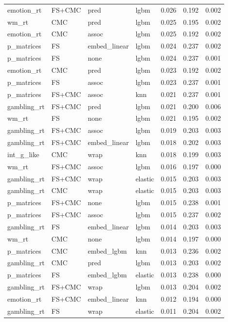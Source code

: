 \documentclass{article}
\begin{document}
\begin{longtable}{llllrrr}
	emotion\_rt & FS+CMC & pred & lgbm & 0.026 & 0.192 & 0.002 \\
	wm\_rt & CMC & pred & lgbm & 0.025 & 0.195 & 0.002 \\
	emotion\_rt & CMC & assoc & lgbm & 0.025 & 0.192 & 0.002 \\
	p\_matrices & FS & embed\_linear & lgbm & 0.024 & 0.237 & 0.002 \\
	p\_matrices & FS & none & lgbm & 0.024 & 0.237 & 0.001 \\
	emotion\_rt & CMC & pred & lgbm & 0.023 & 0.192 & 0.002 \\
	p\_matrices & FS & assoc & lgbm & 0.023 & 0.237 & 0.001 \\
	p\_matrices & FS+CMC & assoc & knn & 0.021 & 0.237 & 0.001 \\
	gambling\_rt & FS+CMC & pred & lgbm & 0.021 & 0.200 & 0.006 \\
	wm\_rt & FS & none & lgbm & 0.021 & 0.195 & 0.002 \\
	gambling\_rt & FS+CMC & assoc & lgbm & 0.019 & 0.203 & 0.003 \\
	gambling\_rt & FS+CMC & embed\_linear & lgbm & 0.018 & 0.202 & 0.003 \\
	int\_g\_like & CMC & wrap & knn & 0.018 & 0.199 & 0.003 \\
	wm\_rt & FS+CMC & assoc & lgbm & 0.016 & 0.197 & 0.000 \\
	gambling\_rt & FS+CMC & wrap & elastic & 0.015 & 0.203 & 0.003 \\
	gambling\_rt & CMC & wrap & elastic & 0.015 & 0.203 & 0.003 \\
	p\_matrices & FS+CMC & none & lgbm & 0.015 & 0.238 & 0.001 \\
	p\_matrices & FS+CMC & assoc & lgbm & 0.015 & 0.237 & 0.002 \\
	gambling\_rt & FS & embed\_linear & lgbm & 0.014 & 0.203 & 0.003 \\
	wm\_rt & CMC & none & lgbm & 0.014 & 0.197 & 0.000 \\
	p\_matrices & CMC & embed\_lgbm & knn & 0.013 & 0.236 & 0.002 \\
	gambling\_rt & CMC & pred & lgbm & 0.013 & 0.203 & 0.002 \\
	p\_matrices & FS & embed\_lgbm & elastic & 0.013 & 0.238 & 0.000 \\
	gambling\_rt & FS+CMC & wrap & lgbm & 0.013 & 0.204 & 0.002 \\
	emotion\_rt & FS+CMC & embed\_linear & knn & 0.012 & 0.194 & 0.000 \\
	gambling\_rt & FS & wrap & elastic & 0.011 & 0.204 & 0.002 \\

\end{longtable}
\end{document}
